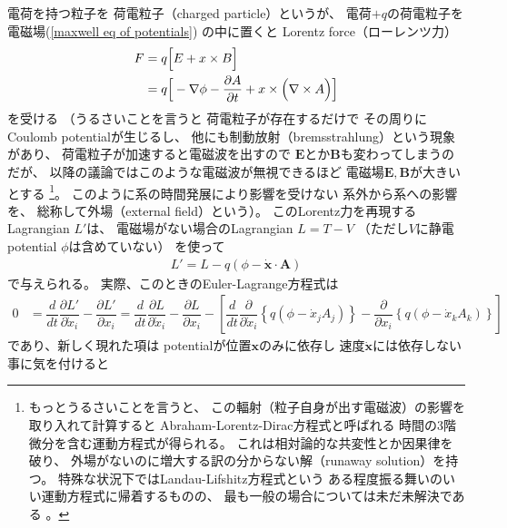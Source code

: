 電荷を持つ粒子を
荷電粒子（charged particle）というが、
電荷$+q$の荷電粒子を
電磁場(\ref{maxwell eq of potentials})
の中に置くと
Lorentz force（ローレンツ力）
\begin{align}
  F
  &=
  q
  \Big[
    E
  +
   x
    \times
    B
  \Big]
\notag\\&=
  q
  \Big[
    - \nabla\phi
    - \dfrac{\partial A}
      {\partial t}
  +
   x
    \times
    \Big(
      \nabla \times A
    \Big)
  \Big]
\label{lorentz force for charged point particle}
\end{align}
を受ける
（うるさいことを言うと
荷電粒子が存在するだけで
その周りにCoulomb potentialが生じるし、
他にも制動放射（bremsstrahlung）という現象があり、
荷電粒子が加速すると電磁波を出すので
$\bm{E}$とか$\bm{B}$も変わってしまうのだが、
以降の議論ではこのような電磁波が無視できるほど
電磁場$\bm{E}, \bm{B}$が大きいとする
\footnote{
  もっとうるさいことを言うと、
  この輻射（粒子自身が出す電磁波）の影響を取り入れて計算すると
  Abraham-Lorentz-Dirac方程式と呼ばれる
  時間の3階微分を含む運動方程式が得られる。
  これは相対論的な共変性とか因果律を破り、
  外場がないのに増大する訳の分からない解（runaway solution）を持つ。
  特殊な状況下ではLandau-Lifshitz方程式という
  ある程度振る舞いのいい運動方程式に帰着するものの、
  最も一般の場合については未だ未解決である
  \cite{Abraham-Lorentz}。
  }。
このように系の時間発展により影響を受けない
系外から系への影響を、
総称して外場（external field）という）。
このLorentz力を再現するLagrangian $L'$は、
電磁場がない場合のLagrangian $L = T - V$
（ただし$V$に静電potential $\phi$は含めていない）
を使って
\begin{align}
  L' = L - q(\phi - \dot{\bm{x}} \cdot \bm{A})
\label{point particle lagrangian with ele-mag potential}
\end{align}
で与えられる。
実際、このときのEuler-Lagrange方程式は
\begin{align}
  0
&=
  \dfrac{d}{dt}
    \dfrac{\partial L'}{\partial \dot{x}_i}
  -
    \dfrac{\partial L'}{\partial x_i}
=
  \dfrac{d}{dt}
    \dfrac{\partial L}{\partial \dot{x}_i}
  -
    \dfrac{\partial L}{\partial x_i}
- \left[
  \dfrac{d}{dt}
    \dfrac{\partial}{\partial \dot{x}_i}
    \left\{
      q(\phi - \dot{x}_j A_j)
    \right\}
  -
    \dfrac{\partial}{\partial x_i}
    \left\{
      q(\phi - \dot{x}_k A_k)
    \right\}
\right]
\label{EL eq for charged point particle}
\end{align}
であり、新しく現れた項は
potentialが位置$\bm{x}$のみに依存し
速度$\dot{\bm{x}}$には依存しない事に気を付けると
